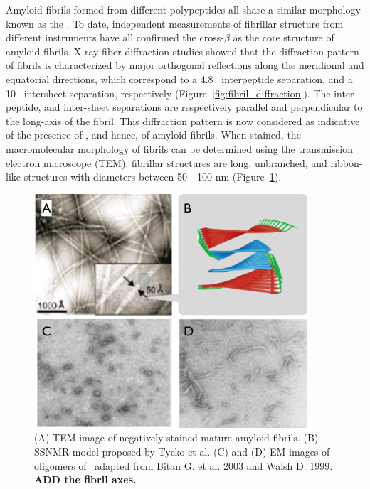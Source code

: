 Amyloid fibrils formed from different polypeptides all share a similar morphology known as the \crossbs. To date, independent measurements of fibrillar structure from different instruments have all confirmed the cross-$\beta$ as the core structure of amyloid fibrils.  X-ray fiber diffraction studies showed that the diffraction pattern of fibrils is characterized by major orthogonal reflections along the meridional and equatorial directions, which correspond to a 4.8 \angstrom\ interpeptide separation, and a 10 \angstrom\ intersheet separation, respectively (Figure~\ref{fig:fibril_diffraction}).\cite{Sunde:1997cq,Makin:2005un,Sipe:2000fs} The inter-peptide, and inter-sheet separations are respectively parallel and perpendicular to the long-axis of the fibril. This diffraction pattern is now considered as indicative of the presence of \crossbs, and hence, of amyloid fibrils. When stained, the macromolecular morphology of fibrils can be determined using the transmission electron microscope (TEM): fibrillar structures are long, unbranched, and ribbon-like structures with diameters between 50 - 100 nm (Figure~\ref{fig:fibril_TEM_SSNMR}).\cite{Chiti:2006fz} 


\begin{figure}
 \centering
 \includegraphics[width=4in]{figures/introduction/fibril_TEM_SSNMR.pdf}
 \caption[EM images of amyloid fibrils and oligomers]{(A) TEM image of negatively-stained mature amyloid fibrils. (B) SSNMR model proposed by Tycko et al. (C) and (D) EM images of oligomers of \ adapted from Bitan G. et al. 2003 and Walsh D. 1999.  \textbf{ADD the fibril axes.}}
 \label{fig:fibril_TEM_SSNMR}
\end{figure}

